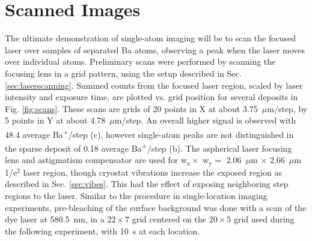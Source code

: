 
\section{Scanned Images}
\label{sec:scanning}

The ultimate demonstration of single-atom imaging will be to scan the focused laser over samples of separated Ba atoms, observing a peak when the laser moves over individual atoms.  Preliminary scans were performed by scanning the focusing lens in a grid pattern, using the setup described in Sec. \ref{sec:laserscanning}.  Summed counts from the focused laser region, scaled by laser intensity and exposure time, are plotted vs. grid position for several deposits in Fig. \ref{fig:scans}.  These scans are grids of 20 points in X at about 3.75~$\mu$m/step, by 5 points in Y at about 4.78~$\mu$m/step.  An overall higher signal is observed with 48.4 average Ba\textsuperscript{+}/step (c), however single-atom peaks are not distinguished in the sparse deposit of 0.18 average Ba\textsuperscript{+}/step (b).  The aspherical laser focusing lens and astigmatism compensator are used for w$_{\text{x}} \times$ w$_{\text{y}} =$ 2.06~$\mu$m $\times$ 2.66~$\mu$m 1/e$^{2}$ laser region, though cryostat vibrations increase the exposed region as described in Sec. \ref{sec:vibes}.  This had the effect of exposing neighboring step regions to the laser.  Similar to the procedure in single-location imaging experiments, pre-bleaching of the surface background was done with a scan of the dye laser at 580.5~nm, in a $22 \times 7$ grid centered on the $20 \times 5$ grid used during the following experiment, with 10~s at each location.

